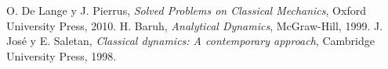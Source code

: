 \documentclass[a4paper,10pt]{article}
\numberwithin{equation}{section}
\begin{document}
\begin{thebibliography}{10}
 O. De Lange y J. Pierrus, \emph{Solved Problems on Classical Mechanics}, Oxford 
 University Press, 2010.
 H. Baruh, \emph{Analytical Dynamics}, McGraw-Hill, 1999.
 J. José y E. Saletan, \emph{Classical dynamics: A contemporary approach}, Cambridge University Press,
 1998.
\end{thebibliography}
\end{document}
